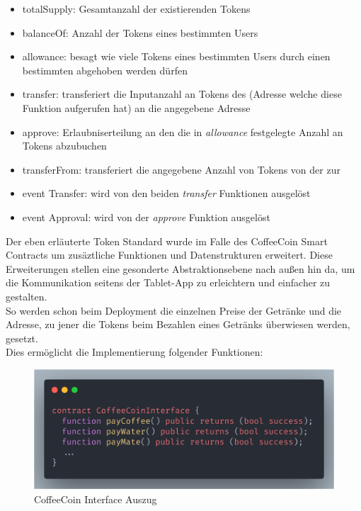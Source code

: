 \begin{itemize}
	\item totalSupply: Gesamtanzahl der existierenden Tokens
	\item balanceOf: Anzahl der Tokens eines bestimmten Users
	\item allowance: besagt wie viele Tokens eines bestimmten Users durch einen bestimmten  abgehoben werden dürfen
	\item transfer: transferiert die Inputanzahl an Tokens des  (Adresse welche diese Funktion aufgerufen hat) an die angegebene Adresse
	\item approve: Erlaubniserteilung an den  die in \textit{allowance} festgelegte Anzahl an Tokens abzubuchen
	\item transferFrom: transferiert die angegebene Anzahl von Tokens von der  zur 
	\item event Transfer: wird von den beiden \textit{transfer} Funktionen ausgelöst
	\item event Approval: wird von der \textit{approve} Funktion ausgelöst
\end{itemize}

Der eben erläuterte Token Standard wurde im Falle des CoffeeCoin Smart Contracts um zusäztliche Funktionen und Datenstrukturen erweitert. Diese Erweiterungen stellen eine gesonderte Abstraktionsebene nach außen hin da, um die Kommunikation seitens der Tablet-App zu erleichtern und einfacher zu gestalten.\\
So werden schon beim Deployment die einzelnen Preise der Getränke und die Adresse, zu jener die Tokens beim Bezahlen eines Getränks überwiesen werden, gesetzt.\\
Dies ermöglicht die Implementierung folgender Funktionen: 

\begin{figure}[th!]
	\centering
	\includegraphics[width=.9\columnwidth]{./Abbildungen/Kapitel_03/CCInterface.png}
	\caption{CoffeeCoin Interface Auszug}
	\label{img:cci}
\end{figure}

